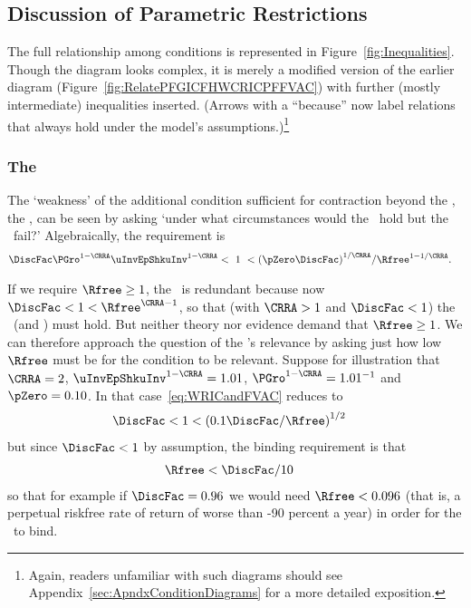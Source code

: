 \documentclass[BufferStockTheory]{subfiles}
\begin{document}
\hypertarget{Discussion-of-Parametric-Restrictions}{}
\subsection{Discussion of Parametric Restrictions}\label{sec:discussConvergence}

The full relationship among conditions is represented in Figure~\ref{fig:Inequalities}.  Though the diagram looks complex, it is merely a modified version of the earlier diagram (Figure~\ref{fig:RelatePFGICFHWCRICPFFVAC}) with further (mostly intermediate) inequalities inserted.  (Arrows with a ``because'' now label relations that always hold under the model's assumptions.)\footnote{Again, readers unfamiliar with such diagrams should see Appendix~\ref{sec:ApndxConditionDiagrams} for a more detailed exposition.}

\renewcommand{\figName}{Inequalities} %
\renewcommand{\figFile}{\figName} %
\hypertarget{\figFile}{}

\subsubsection{The \WRIC}\label{subsubsec:WRICdiscuss}

The `weakness' of the additional condition sufficient for contraction beyond the {\FVAC}, the
\WRIC, can be seen by asking `under what circumstances
would the \FVAC~hold but the \WRIC~fail?'
Algebraically, the requirement is
\begin{align}
  \DiscFac \PGro^{1-\CRRA}\uInvEpShkuInv^{1-\CRRA} & < ~ 1 ~ <  {(\pZero \DiscFac)}^{1/\CRRA}/\Rfree^{1-1/\CRRA}. \label{eq:WRICandFVAC}
\end{align}

If we require $\Rfree \geq 1$, the {\WRIC}~is redundant because now $\DiscFac <1<\Rfree^{\CRRA-1}$, so that (with $\CRRA > 1$ and $\DiscFac<1$) the \RIC~(and \WRIC) must hold.  But neither theory nor evidence demand that $\Rfree \geq
1$.  We can therefore approach the question of the \WRIC's relevance by asking just how low $\Rfree$ must be for the condition to be relevant.
Suppose for illustration that $\CRRA=2$, $\uInvEpShkuInv^{1-\CRRA}=1.01$,
$\PGro^{1-\CRRA}=1.01^{-1}$ and $\pZero = 0.10$.  In that case~\eqref{eq:WRICandFVAC} reduces to
\begin{align*}
  \DiscFac  & < 1 < {(0.1 \DiscFac/\Rfree)}^{1/2}
\end{align*}
but since $\DiscFac < 1$ by assumption, the binding requirement is that
\begin{align*}
  \Rfree  & < \DiscFac/10 \notag
\end{align*}
so that for example if $\DiscFac=0.96$ we would need $\Rfree < 0.096$
(that is, a perpetual riskfree rate of return of worse than -90
percent a year) in order for the \WRIC~to bind. %
\end{document}

